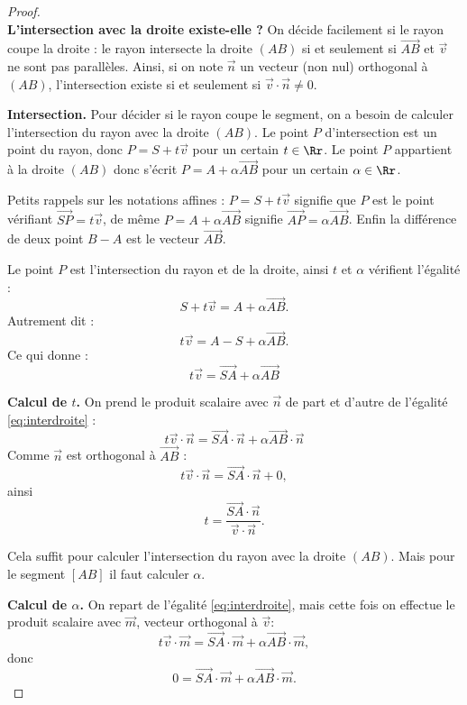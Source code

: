 \documentclass[11pt,class=report,crop=false]{standalone}
\begin{document}
\begin{proof}
\ \\
\textbf{L'intersection avec la droite existe-elle ?}
On décide facilement si le rayon coupe la droite :
le rayon intersecte la droite $(AB)$ si et seulement si $\overrightarrow{AB}$ et $\vec v$ ne sont pas parallèles.
Ainsi, si on note $\vec n$ un vecteur (non nul) orthogonal à $(AB)$, l'intersection existe si et seulement si $\vec v \cdot \vec n \neq 0$.

\medskip
\textbf{Intersection.}
Pour décider si le rayon coupe le segment, on a besoin de calculer l'intersection du rayon avec la droite $(AB)$.
Le point $P$ d'intersection est un point du rayon, donc $P = S + t\vec{v}$ pour un certain $t\in\Rr$.
Le point $P$ appartient à la droite $(AB)$ donc s'écrit $P = A + \alpha \overrightarrow{AB}$ pour un certain $\alpha\in\Rr$.

Petits rappels sur les notations affines : $P = S + t\vec{v}$ signifie que $P$ est le point vérifiant $\overrightarrow{SP} = t \vec{v}$, de même $P = A + \alpha \overrightarrow{AB}$ signifie  $\overrightarrow{AP} = \alpha \overrightarrow{AB}$. Enfin la différence de deux point $B-A$ est le vecteur $\overrightarrow{AB}$.


Le point $P$ est l'intersection du rayon et de la droite, ainsi $t$ et $\alpha$ vérifient l'égalité :
$$S + t \vec{v} = A + \alpha \overrightarrow{AB}.$$
Autrement dit :
$$t \vec{v} = A-S + \alpha \overrightarrow{AB}.$$
Ce qui donne :
\begin{equation}
\label{eq:interdroite}
t \vec{v} = \overrightarrow{SA} + \alpha \overrightarrow{AB}
\end{equation}





\medskip
\textbf{Calcul de $t$.}
On prend le produit scalaire avec $\vec n$ de part et d'autre de l'égalité \eqref{eq:interdroite} :
$$t \vec{v}\cdot\vec{n} = \overrightarrow{SA}\cdot\vec{n} + \alpha \overrightarrow{AB}\cdot\vec{n}$$
Comme $\vec{n}$ est orthogonal à $\overrightarrow{AB}$ :
$$t \vec{v}\cdot\vec{n} = \overrightarrow{SA}\cdot\vec{n} + 0,$$
ainsi
$$t = \frac{\overrightarrow{SA}\cdot\vec{n}}{\vec{v}\cdot\vec{n}}.$$

Cela suffit pour calculer l'intersection du rayon avec la droite $(AB)$. Mais pour le segment $[AB]$ il faut calculer $\alpha$.

\medskip
\textbf{Calcul de $\alpha$.}
On repart de l'égalité \eqref{eq:interdroite}, mais cette fois on effectue le produit scalaire avec $\vec m$, vecteur orthogonal à $\vec v$:
$$t \vec{v}\cdot\vec{m} = \overrightarrow{SA}\cdot\vec{m} + \alpha \overrightarrow{AB}\cdot\vec{m},$$
donc
$$0 = \overrightarrow{SA}\cdot\vec{m} + \alpha \overrightarrow{AB}\cdot\vec{m}.$$


\end{proof}
\end{document}
